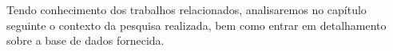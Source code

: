 Tendo conhecimento dos trabalhos relacionados, analisaremos no capítulo seguinte o contexto da pesquisa realizada, bem como entrar em detalhamento sobre a base de dados fornecida.













